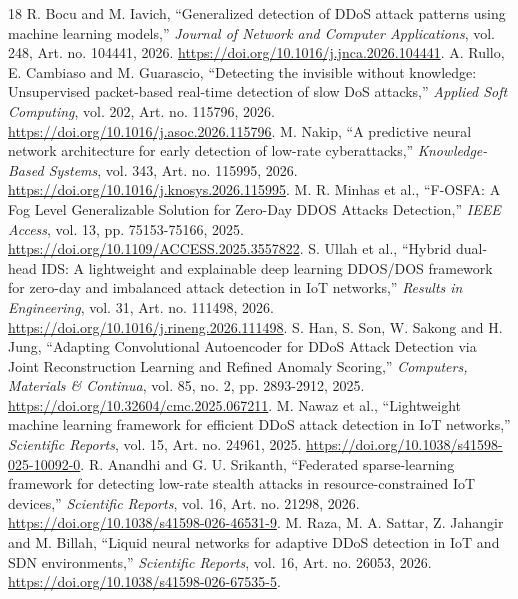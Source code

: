 \documentclass[conference]{IEEEtran}
\begin{document}
\begin{thebibliography}{18}
 R. Bocu and M. Iavich, ``Generalized detection of DDoS attack patterns using machine learning models,\textquotedblright{} \emph{Journal of Network and Computer Applications}, vol. 248, Art. no. 104441, 2026. \url{https://doi.org/10.1016/j.jnca.2026.104441}.
 A. Rullo, E. Cambiaso and M. Guarascio, ``Detecting the invisible without knowledge: Unsupervised packet-based real-time detection of slow DoS attacks,\textquotedblright{} \emph{Applied Soft Computing}, vol. 202, Art. no. 115796, 2026. \url{https://doi.org/10.1016/j.asoc.2026.115796}.
 M. Nakip, ``A predictive neural network architecture for early detection of low-rate cyberattacks,\textquotedblright{} \emph{Knowledge-Based Systems}, vol. 343, Art. no. 115995, 2026. \url{https://doi.org/10.1016/j.knosys.2026.115995}.
 M. R. Minhas et al., ``F-OSFA: A Fog Level Generalizable Solution for Zero-Day DDOS Attacks Detection,\textquotedblright{} \emph{IEEE Access}, vol. 13, pp. 75153-75166, 2025. \url{https://doi.org/10.1109/ACCESS.2025.3557822}.
 S. Ullah et al., ``Hybrid dual-head IDS: A lightweight and explainable deep learning DDOS/DOS framework for zero-day and imbalanced attack detection in IoT networks,\textquotedblright{} \emph{Results in Engineering}, vol. 31, Art. no. 111498, 2026. \url{https://doi.org/10.1016/j.rineng.2026.111498}.
 S. Han, S. Son, W. Sakong and H. Jung, ``Adapting Convolutional Autoencoder for DDoS Attack Detection via Joint Reconstruction Learning and Refined Anomaly Scoring,\textquotedblright{} \emph{Computers, Materials \& Continua}, vol. 85, no. 2, pp. 2893-2912, 2025. \url{https://doi.org/10.32604/cmc.2025.067211}.
 M. Nawaz et al., ``Lightweight machine learning framework for efficient DDoS attack detection in IoT networks,\textquotedblright{} \emph{Scientific Reports}, vol. 15, Art. no. 24961, 2025. \url{https://doi.org/10.1038/s41598-025-10092-0}.
 R. Anandhi and G. U. Srikanth, ``Federated sparse-learning framework for detecting low-rate stealth attacks in resource-constrained IoT devices,\textquotedblright{} \emph{Scientific Reports}, vol. 16, Art. no. 21298, 2026. \url{https://doi.org/10.1038/s41598-026-46531-9}.
 M. Raza, M. A. Sattar, Z. Jahangir and M. Billah, ``Liquid neural networks for adaptive DDoS detection in IoT and SDN environments,\textquotedblright{} \emph{Scientific Reports}, vol. 16, Art. no. 26053, 2026. \url{https://doi.org/10.1038/s41598-026-67535-5}.

\end{thebibliography}
\end{document}

